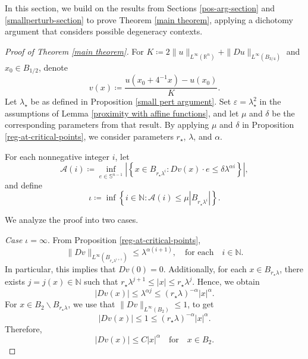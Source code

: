 \documentclass[reqno,11pt]{amsart}
\numberwithin{equation}{section}
\numberwithin{equation}{section}
\begin{document}
In this section, we build on the results from Sections \ref{pos-arg-section} and \ref{smallperturb-section} to prove Theorem \ref{main theorem}, applying a dichotomy argument that considers possible degeneracy contexts. 

\begin{proof}[Proof of Theorem \ref{main theorem}]
For $K \coloneqq 2\|u\|_{L^\infty(\mathbb{R}^n)} + \|Du\|_{L^\infty(B_{3/4})}$ and $x_0 \in B_{1/2}$, denote
$$
    v(x) \coloneqq \frac{u(x_0+4^{-1}x) - u(x_0)}{K}.
$$
Let \(\lambda_\star\) be as defined in Proposition \ref{small pert argument}. Set \(\varepsilon = \lambda_\star^2\) in the assumptions of Lemma \ref{proximity with affine functions}, and let \(\mu\) and \(\delta\) be the corresponding parameters from that result. By applying \(\mu\) and \(\delta\) in Proposition \ref{reg-at-critical-points}, we consider parameters \(r_\star\), \(\lambda\), and \(\alpha\). 

For each nonnegative integer $i$, let
$$
    \mathcal{A}(i) \coloneqq \inf_{e \in \mathbb{S}^{n-1}}\left|\left\{x \in B_{r_\star\lambda^i}\colon Dv(x) \cdot e \leq \delta \lambda^{\alpha i}  \right\} \right|,
$$
and define
\begin{equation}\label{positivity every direction main result}
    \iota \coloneqq \inf\left\{i \in \mathbb{N} \colon \mathcal{A}(i) \leq \mu |B_{r_\star \lambda^i}| \right\}.
\end{equation}

We analyze the proof into two cases.

\textit{Case $\iota = \infty$}. From Proposition \ref{reg-at-critical-points}, 
$$
    \|Dv\|_{L^\infty\left(B_{r_\star\lambda^{i+1}}\right)} \leq \lambda^{\alpha (i+1)}, \quad \mbox{for each} \quad i \in \mathbb{N}.
$$
In particular, this implies that $Dv(0) = 0$. Additionally, for each $x \in B_{r_\star \lambda}$, there exists $j=j(x) \in \mathbb{N}$ such that $r_\star \lambda^{j+1} \leq |x| \leq r_\star \lambda^{j}$. Hence, we obtain
\begin{equation}
    |Dv(x)| \leq \lambda^{\alpha j} \leq (r_\star \lambda)^{-\alpha}|x|^\alpha.
\end{equation}
For $x \in B_2 \backslash B_{r_\star \lambda}$, we use that $\|Dv\|_{L^\infty(B_2)} \leq 1$, to get
$$
    |Dv(x)| \leq 1 \leq (r_\star \lambda)^{-\alpha}|x|^\alpha.
$$
Therefore, 
$$
    |Dv(x)| \leq C|x|^{\alpha} \quad \mbox{for} \quad x \in B_2.
$$


\end{proof}
\end{document}
